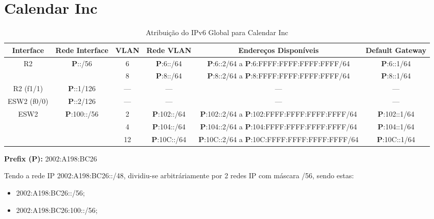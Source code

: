 \documentclass{report}
\begin{document}
\section*{Calendar Inc}

\begin{table}[h!]
    \hspace*{-4.0cm}
    \centering
    \setlength{\tabcolsep}{2pt} %
    \renewcommand{\arraystretch}{1.3} %
    \begin{tabular}{|c|c|c|c|c|c|} %
        \hline
        \textbf{Interface} & \textbf{Rede Interface} & \textbf{VLAN} & \textbf{Rede VLAN} & \textbf{Endereços Disponíveis} & \textbf{Default Gateway} \\ \hline
        
        \multirow{2}{*}{R2} & \multirow{2}{*}{\textbf{P}::/56} & 6 & \textbf{P}:6::/64 & \textbf{P}:6::2/64 a \textbf{P}:6:FFFF:FFFF:FFFF:FFFF/64 & \textbf{P}:6::1/64 \\ \cline{3-6}   
         & & 8 & \textbf{P}:8::/64 & \textbf{P}:8::2/64 a \textbf{P}:8:FFFF:FFFF:FFFF:FFFF/64 & \textbf{P}:8::1/64 \\ \cline{3-6} \hline

         R2 (f1/1) & \textbf{P}::1/126 & --- & --- & --- & --- \\ \hline

         ESW2 (f0/0) & \textbf{P}::2/126 & --- & --- & --- & --- \\ \hline
         
        \multirow{3}{*}{ESW2} & \multirow{3}{*}{\textbf{P}:100::/56} & 2 & \textbf{P}:102::/64 & \textbf{P}:102::2/64 a \textbf{P}:102:FFFF:FFFF:FFFF:FFFF/64 & \textbf{P}:102::1/64 \\ \cline{3-6} 
         & & 4 & \textbf{P}:104::/64 & \textbf{P}:104::2/64 a \textbf{P}:104:FFFF:FFFF:FFFF:FFFF/64 & \textbf{P}:104::1/64 \\ \cline{3-6}   
         & & 12 & \textbf{P}:10C::/64 & \textbf{P}:10C::2/64 a \textbf{P}:10C:FFFF:FFFF:FFFF:FFFF/64 & \textbf{P}:10C::1/64 \\ \hline

    \end{tabular}
    \textbf{Prefix (P):}
    2002:A198:BC26
    \caption{Atribuição do IPv6 Global para Calendar Inc}
\end{table}

Tendo a rede IP 2002:A198:BC26::/48, dividiu-se arbitráriamente por 2 redes IP com máscara /56, sendo estas: 
\begin{itemize}
    \item 2002:A198:BC26::/56;
    \item 2002:A198:BC26:100::/56; 
\end{itemize}
\end{document}
